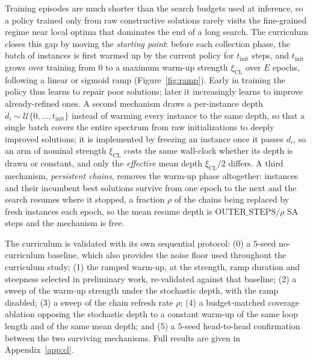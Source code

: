 \documentclass[letterpaper]{article} %
\begin{document}
Training episodes are much shorter than the search budgets used at inference, so a policy trained only from raw constructive solutions rarely visits the fine-grained regime near local optima that dominates the end of a long search. The curriculum \citep{ma_learning_2021} closes this gap by moving the \textit{starting point}: before each collection phase, the batch of instances is first warmed up by the current policy for $t_{\mathrm{init}}$ steps, and $t_{\mathrm{init}}$ grows over training from $0$ to a maximum warm-up strength $\xi_{\mathrm{CL}}$ over $E$ epochs, following a linear or sigmoid ramp (Figure~\ref{fig:ramp}). Early in training the policy thus learns to repair poor solutions; later it increasingly learns to improve already-refined ones. A second mechanism draws a per-instance depth $d_i \sim \mathcal{U}\{0, \dots, t_{\mathrm{init}}\}$ instead of warming every instance to the same depth, so that a single batch covers the entire spectrum from raw initializations to deeply improved solutions; it is implemented by freezing an instance once it passes $d_i$, so an arm of nominal strength $\xi_{\mathrm{CL}}$ costs the same wall-clock whether its depth is drawn or constant, and only the \emph{effective} mean depth $\xi_{\mathrm{CL}}/2$ differs. A third mechanism, \emph{persistent chains}, removes the warm-up phase altogether: instances and their incumbent best solutions survive from one epoch to the next and the search resumes where it stopped, a fraction $\rho$ of the chains being replaced by fresh instances each epoch, so the mean resume depth is $\mathrm{OUTER\_STEPS}/\rho$ SA steps and the mechanism is free.

The curriculum is validated with its own sequential protocol: (0) a $5$-seed no-curriculum baseline, which also provides the noise floor used throughout the curriculum study; (1) the ramped warm-up, at the strength, ramp duration and steepness selected in preliminary work, re-validated against that baseline; (2) a sweep of the warm-up strength under the stochastic depth, with the ramp disabled; (3) a sweep of the chain refresh rate $\rho$; (4) a budget-matched coverage ablation opposing the stochastic depth to a constant warm-up of the same loop length and of the same mean depth; and (5) a $5$-seed head-to-head confirmation between the two surviving mechanisms. Full results are given in Appendix~\ref{app:cl}.
\end{document}
